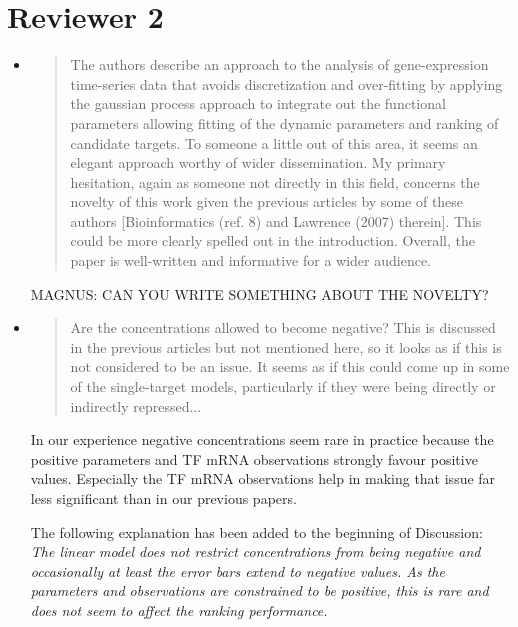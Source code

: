 \documentclass{article}
\begin{document}
\newpage

\section*{Reviewer 2}

\begin{itemize}
\item \begin{quote} The authors describe an approach to the analysis
    of gene-expression time-series data that avoids discretization and
    over-fitting by applying the gaussian process approach to
    integrate out the functional parameters allowing fitting of the
    dynamic parameters and ranking of candidate targets. To someone a
    little out of this area, it seems an elegant approach worthy of
    wider dissemination. My primary hesitation, again as someone not
    directly in this field, concerns the novelty of this work given
    the previous articles by some of these authors [Bioinformatics
    (ref. 8) and Lawrence (2007) therein]. This could be more clearly
    spelled out in the introduction. Overall, the paper is
    well-written and informative for a wider audience.
\end{quote}

MAGNUS: CAN YOU WRITE SOMETHING ABOUT THE NOVELTY?

\item \begin{quote} Are the concentrations allowed to become negative?
    This is discussed in the previous articles but not mentioned here,
    so it looks as if this is not considered to be an issue. It seems
    as if this could come up in some of the single-target models,
    particularly if they were being directly or indirectly
    repressed...
\end{quote}

In our experience negative concentrations seem rare in practice
because the positive parameters and TF mRNA observations strongly
favour positive values.  Especially the TF mRNA observations help in
making that issue far less significant than in our previous papers.

The following explanation has been added to the beginning of Discussion:
\emph{The linear model does not restrict concentrations from being negative
and occasionally at least the error bars extend to negative values.
As the parameters and observations are constrained to be positive,
this is rare and does not seem to affect the ranking performance.}


\end{itemize}
\end{document}
